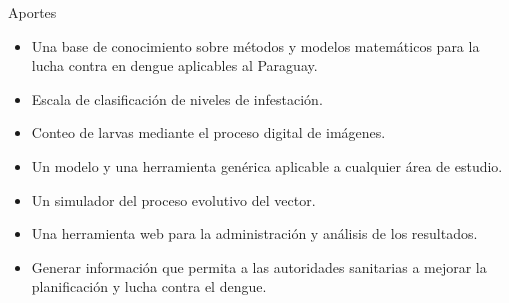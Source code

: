 \begin{frame}[t]{Aportes}
    \begin{itemize}
        \item Una base de conocimiento sobre métodos y modelos matemáticos para la lucha contra en dengue aplicables al Paraguay.
        \item Escala de clasificación de niveles de infestación.
        \item Conteo de larvas mediante el proceso digital de imágenes.
        \item Un modelo y una herramienta genérica aplicable a cualquier área de estudio.
        \item Un simulador del proceso evolutivo del vector.
        \item Una herramienta web para la administración y análisis de los resultados.
        \item Generar información que permita a las autoridades sanitarias a mejorar la planificación y lucha contra el dengue.
    \end{itemize}
\end{frame}
